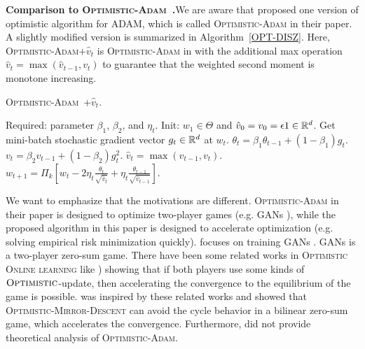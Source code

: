 \documentclass[11pt]{article}
\theoremstyle{k}
\begin{document}
\textbf{Comparison to \textsc{Optimistic-Adam}~\citep{DISZ18}.}\hspace{0.1in}We are aware that \citep{DISZ18} proposed one version of optimistic algorithm for ADAM, which
is called \textsc{Optimistic-Adam} in their paper. A slightly modified version is summarized in Algorithm~\ref{OPT-DISZ}. Here, \textsc{Optimistic-Adam$+\hat{v}_t$} is \textsc{Optimistic-Adam} in \citep{DISZ18} with the additional max operation $\hat{v}_t = \max ( \hat{v}_{t-1}, v_t)$ to guarantee that the weighted second moment is monotone increasing.

\begin{algorithm}[h]
\begin{algorithmic}[1]
\caption{\textsc{Optimistic-Adam~\citep{DISZ18}+$\hat{v}_t$}. \label{OPT-DISZ}}
\STATE Required: parameter $\beta_1$, $\beta_2$, and $\eta_t$.
\STATE Init: $w_1 \in \Theta$ and $\hat{v}_0 = v_{0} = \epsilon 1 \in \mathbb{R}^{d}$.
\STATE Get mini-batch stochastic gradient vector $g_t \in \mathbb{R}^d$ at $w_t$.
\STATE $\theta_t = \beta_{1} \theta_{t-1} + (1 - \beta_{1}) g_t$.
\STATE $v_t = \beta_2 v_{t-1} + (1 - \beta_2) g_t^2$.
\STATE $\hat{v}_t = \max( \hat{v}_{t-1} , v_t )$.
\STATE $w_{t+1} = \Pi_{k}[ w_{t} - 2 \eta_t \frac{\theta_t}{ \sqrt{\hat{v}_t }}
+ \eta_t \frac{\theta_{t-1}}{ \sqrt{\hat{v}_{t-1}} }]$.
\ENDFOR
\end{algorithmic}
\end{algorithm}

We want to emphasize that the motivations are different. \textsc{Optimistic-Adam} in their paper is designed to optimize two-player games (e.g. GANs \citep{goodfellow2014generative}),
while the proposed algorithm in this paper is designed to accelerate optimization
(e.g. solving empirical risk minimization quickly).
\citep{DISZ18} focuses on training GANs \citep{goodfellow2014generative}. GANs is a two-player zero-sum game. There have been some related works in \textsc{Optimistic Online learning} like \citep{CJ12,RS13b,SALS15})
showing that if both players use some kinds of $\textsc{Optimistic}$-update,
then accelerating the convergence to the equilibrium of the game is possible.
\citep{DISZ18} was inspired by these related works and showed that \textsc{Optimistic-Mirror-Descent}
can avoid the cycle behavior in a bilinear zero-sum game, which accelerates the convergence. Furthermore, \citep{DISZ18} did not provide theoretical analysis of \textsc{Optimistic-Adam}.


\clearpage
\end{document}
